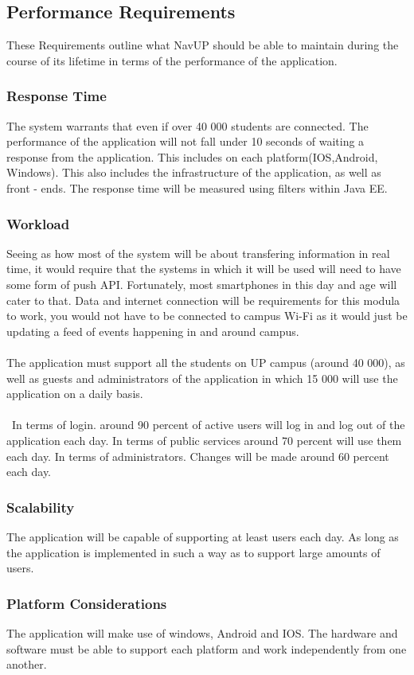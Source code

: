 \documentclass{article}
\begin{document}
	\subsection{Performance Requirements}
	These Requirements outline what NavUP should be able to maintain during the course of its lifetime in terms of the performance of the application.
		\subsubsection{Response Time}
		The system warrants that even if over 40 000 students are connected. The performance of the application will not fall under 10 seconds of waiting a response from the application. This includes on each platform(IOS,Android, Windows). This also includes the infrastructure of the application, as well as front - ends. The response time will be measured using filters within Java EE.
		\subsubsection{Workload}
		Seeing as how most of the system will be about transfering information in real time, it would require that the systems in which it will be used will need to have some form of push API. Fortunately, most smartphones in this day and age will cater to that. Data and internet connection will be requirements for this modula to work, you would not have to be connected to campus Wi-Fi as it would just be updating a feed of events happening in and around campus.\\\\
		The application must support all the students on UP campus (around 40 000), as well as guests and administrators of the application in which 15 000 will use the application on a daily basis.\\\\\
		In terms of login. around 90 percent of active users will log in and log out of the application each day. In terms of public services around 70 percent will use them each day. In terms of administrators. Changes will be made around 60 percent each day.
		\subsubsection{Scalability}
		The application will be capable of supporting at least users each day. As long as the application is implemented in such a way as to support large amounts of users.
		\subsubsection{Platform Considerations}
		The application will make use of windows, Android and IOS. The hardware and software must be able to support each platform and work independently from one another.
		
\end{document}
